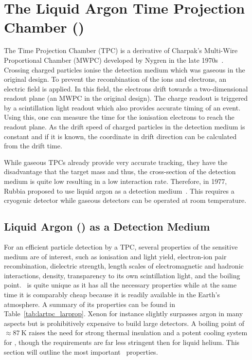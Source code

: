 \chapter{The Liquid Argon Time Projection Chamber (\lartpc)\label{chap:lartpc}}

The Time Projection Chamber (TPC) is a derivative of Charpak's Multi-Wire Proportional Chamber (MWPC)\cite{mwpc} developed by Nygren in the late 1970s~\cite{nygrenTPC}.
Crossing charged particles ionise the detection medium which was gaseous in the original design.
To prevent the recombination of the ions and electrons, an electric field is applied.
In this field, the electrons drift towards a two-dimensional readout plane (an MWPC in the original design).
The charge readout is triggered by a scintillation light readout which also provides accurate timing of an event.
Using this, one can measure the time for the ionisation electrons to reach the readout plane.
As the drift speed of charged particles in the detection medium is constant and if it is known, the coordinate in drift direction can be calculated from the drift time.

While gaseous TPCs already provide very accurate tracking, they have the disadvantage that the target mass and thus, the cross-section of the detection medium is quite low resulting in a low interaction rate.
Therefore, in 1977, Rubbia proposed to use liquid argon as a detection medium~\cite{lartpc}.
This requires a cryogenic detector while gaseous detectors can be operated at room temperature.


\section{Liquid Argon (\lar) as a Detection Medium\label{sec:lartpc_lar}}

For an efficient particle detection by a TPC, several properties of the sensitive medium are of interest, such as ionisation and light yield, electron-ion pair recombination, dielectric strength, length scales of electromagnetic and hadronic interactions, density, transparency to its own scintillation light, and the boiling point.
\lar\ is quite unique as it has all the necessary properties while at the same time it is comparably cheap because it is readily available in the Earth's atmosphere.
A summary of its properties can be found in Table~\ref{tab:lartpc_larprop}.
Xenon for instance slightly surpasses argon in many aspects but is prohibitively expensive to build large detectors.
A boiling point of $\approx \SI{87}{\kelvin}$ raises the need for strong thermal insulation and a potent cooling system for \lar , though the requirements are far less stringent then for liquid helium.
This section will outline the most important \lar\ properties.

